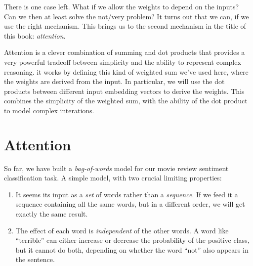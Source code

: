\documentclass{pca}
\theoremstyle{theorem}
\theoremstyle{definition}
\theoremstyle{proof}
\begin{document}
There is one case left. What if we allow the weights to depend on the inputs? Can we then at least solve the not/very problem? It turns out that we can, if we use the right mechanism. This brings us to the second mechanism in the title of this book: \emph{attention}.

Attention is a clever combination of summing and dot products that provides a very powerful tradeoff between simplicity and the ability to represent complex reasoning. it works by defining this kind of weighted sum we've used here, where the weights are derived from the input. In particular, we will use the dot products between different input embedding vectors to derive the weights. This combines the simplicity of the weighted sum, with the ability of the dot product to model complex interations.

%
%


\chapter{Attention}

So far, we have built a \emph{bag-of-words} model for our movie review sentiment classification task. A simple model, with two crucial limiting properties:
\begin{enumerate}
\item It seems its input as a \emph{set} of words rather than a \emph{sequence}. If we feed it a sequence containing all the same words, but in a different order, we will get exactly the same result. \label{item:perm-equivariance}
\item The effect of each word is \emph{independent} of the other words. A word like ``terrible'' can either increase or decrease the probability of the positive class, but it cannot do both, depending on whether the word ``not'' also appears in the sentence. \label{item:independence}
\end{enumerate}
\end{document}
